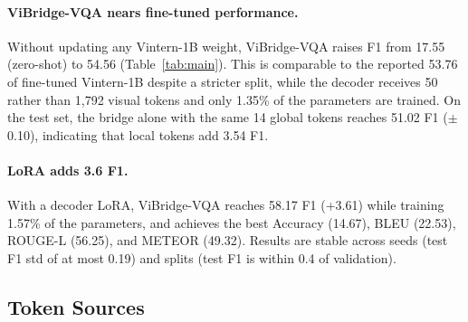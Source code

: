 \paragraph{ViBridge-VQA nears fine-tuned performance.}
Without updating any Vintern-1B weight, ViBridge-VQA raises F1 from 17.55 (zero-shot) to 54.56
(Table~\ref{tab:main}). This is comparable to the reported 53.76 of fine-tuned Vintern-1B despite
a stricter split, while the decoder receives 50 rather than 1{,}792 visual tokens and only 1.35\%
of the parameters are trained. On the test set, the bridge alone with the same 14 global tokens
reaches 51.02 F1 ($\pm$0.10), indicating that local tokens add 3.54 F1.

\paragraph{LoRA adds 3.6 F1.}
With a decoder LoRA, ViBridge-VQA reaches 58.17 F1 (+3.61) while training 1.57\% of the
parameters, and achieves the best Accuracy (14.67), BLEU (22.53), ROUGE-L (56.25), and METEOR
(49.32). Results are stable across seeds (test F1 std of at most 0.19) and splits (test F1 is
within 0.4 of validation).

\subsection{Token Sources}
\label{sec:rq-source}

